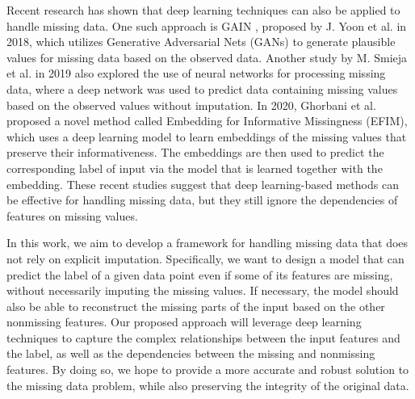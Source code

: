 Recent research has shown that deep learning techniques can also be applied to handle missing data. One such approach is GAIN \cite{GAIN}, proposed by J. Yoon et al. in 2018, which utilizes Generative Adversarial Nets (GANs) to generate plausible values for missing data based on the observed data. Another study by M. Smieja et al. \cite{Smieja} in 2019 also explored the use of neural networks for processing missing data, where a deep network was used to predict data containing missing values based on the observed values without imputation. In 2020, Ghorbani et al. \cite{Ghorbani} proposed a novel method called Embedding for Informative Missingness (EFIM), which uses a deep learning model to learn embeddings of the missing values that preserve their informativeness. The embeddings are then used to predict the corresponding label of input via the model that is learned together with the embedding. These recent studies suggest that deep learning-based methods can be effective for handling missing data, but they still ignore the dependencies of features on missing values.

In this work, we aim to develop a framework for handling missing data that does not rely on explicit imputation. Specifically, we want to design a model that can predict the label of a given data point even if some of its features are missing, without necessarily imputing the missing values. If necessary, the model should also be able to reconstruct the missing parts of the input based on the other nonmissing features. Our proposed approach will leverage deep learning techniques to capture the complex relationships between the input features and the label, as well as the dependencies between the missing and nonmissing features. By doing so, we hope to provide a more accurate and robust solution to the missing data problem, while also preserving the integrity of the original data.




